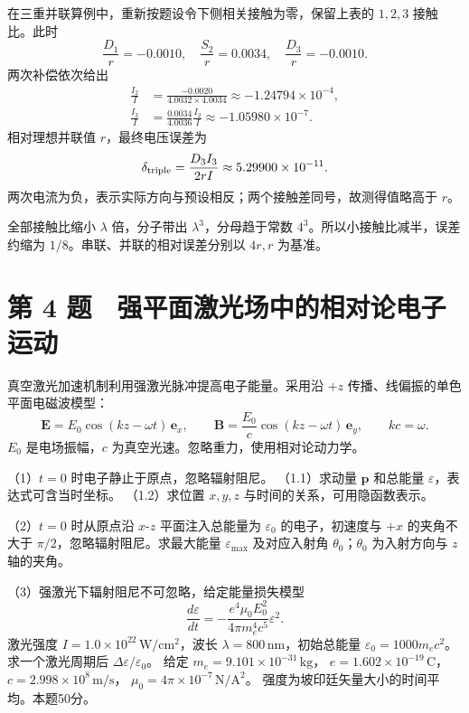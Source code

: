 \documentclass[12pt,a4paper,fontset=fandol]{ctexart}
\begin{document}
在三重并联算例中，重新按题设令下侧相关接触为零，保留上表的 \(1,2,3\)
接触比。此时 \[
\frac{D_1}{r}=-0.0010,\quad
\frac{S_2}{r}=0.0034,\quad
\frac{D_3}{r}=-0.0010.
\] 两次补偿依次给出 \[
\begin{aligned}
\frac{I_2}{I}&=\frac{-0.0020}{4.0032\times4.0034}
\approx-1.24794\times10^{-4},\\
\frac{I_3}{I}&=\frac{0.0034}{4.0036}\frac{I_2}{I}
\approx-1.05980\times10^{-7}.
\end{aligned}
\] 相对理想并联值 \(r\)，最终电压误差为 \[
\delta_{\rm triple}
=\frac{D_3I_3}{2rI}
\approx5.29900\times10^{-11}.
\] 两次电流为负，表示实际方向与预设相反；两个接触差同号，故测得值略高于
\(r\)。

全部接触比缩小 \(\lambda\) 倍，分子带出 \(\lambda^3\)，分母趋于常数
\(4^3\)。所以小接触比减半，误差约缩为
\(1/8\)。串联、并联的相对误差分别以 \(4r,r\) 为基准。

\clearpage

\section{第 4
题　强平面激光场中的相对论电子运动}\label{ux7b2c-4-ux9898-ux5f3aux5e73ux9762ux6fc0ux5149ux573aux4e2dux7684ux76f8ux5bf9ux8bbaux7535ux5b50ux8fd0ux52a8}

真空激光加速机制利用强激光脉冲提高电子能量。采用沿 \(+z\)
传播、线偏振的单色平面电磁波模型： \[
\mathbf E=E_0\cos(kz-\omega t)\,\mathbf e_x,\qquad
\mathbf B=\frac{E_0}{c}\cos(kz-\omega t)\,\mathbf e_y,
\qquad kc=\omega.
\] \(E_0\) 是电场振幅，\(c\) 为真空光速。忽略重力，使用相对论动力学。

（1）\(t=0\) 时电子静止于原点，忽略辐射阻尼。 （1.1）求动量
\(\mathbf p\) 和总能量 \(\varepsilon\)，表达式可含当时坐标。
（1.2）求位置 \(x,y,z\) 与时间的关系，可用隐函数表示。

（2）\(t=0\) 时从原点沿 \(x\)-\(z\) 平面注入总能量为 \(\varepsilon_0\)
的电子，初速度与 \(+x\) 的夹角不大于 \(\pi/2\)，忽略辐射阻尼。求最大能量
\(\varepsilon_{\max}\) 及对应入射角 \(\theta_0\)；\(\theta_0\)
为入射方向与 \(z\) 轴的夹角。

（3）强激光下辐射阻尼不可忽略，给定能量损失模型 \[
\frac{d\varepsilon}{dt}
=-\frac{e^4\mu_0E_0^2}{4\pi m_e^4c^5}\varepsilon^2.
\] 激光强度 \(I=1.0\times10^{22}\,\mathrm{W/cm^2}\)，波长
\(\lambda=800\,\mathrm{nm}\)，初始总能量
\(\varepsilon_0=1000m_ec^2\)。求一个激光周期后
\(\Delta\varepsilon/\varepsilon_0\)。 给定
\(m_e=9.101\times10^{-31}\,\mathrm{kg}\)，
\(e=1.602\times10^{-19}\,\mathrm C\)，
\(c=2.998\times10^8\,\mathrm{m/s}\)，
\(\mu_0=4\pi\times10^{-7}\,\mathrm{N/A^2}\)。
强度为坡印廷矢量大小的时间平均。本题50分。
\end{document}
